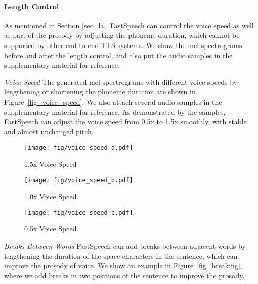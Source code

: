\documentclass{article}
\begin{document}
\paragraph{Length Control}
As mentioned in Section \ref{sec_la}, FastSpeech can control the voice speed as well as part of the prosody by adjusting the phoneme duration, which cannot be supported by other end-to-end TTS systems. We show the mel-spectrograms before and after the length control, and also put the audio samples in the supplementary material for reference.

\emph{Voice Speed}
The generated mel-spectrograms with different voice speeds by lengthening or shortening the phoneme duration are shown in Figure~\ref{fig_voice_speed}. We also attach several audio samples in the supplementary material for reference. As demonstrated by the samples, FastSpeech can adjust the voice speed from 0.5x to 1.5x smoothly, with stable and almost unchanged pitch. 

\begin{figure*}[h] 
	\centering
	\begin{subfigure}[h]{0.2\textwidth}
		\centering
		\texttt{[image: fig/voice\_speed\_a.pdf]}
		\caption{1.5x Voice Speed}
		\label{fig_rate150}
	\end{subfigure}
	\begin{subfigure}[h]{0.25\textwidth}
		\centering
		\texttt{[image: fig/voice\_speed\_b.pdf]}
		\caption{1.0x Voice Speed}
		\label{fig_rate100}
	\end{subfigure}
	\begin{subfigure}[h]{0.5\textwidth}
		\centering
		\texttt{[image: fig/voice\_speed\_c.pdf]}
		\caption{0.5x Voice Speed}
		\label{fig_rate050}
	\end{subfigure}
	\caption{The mel-spectrograms of the voice with 1.5x, 1.0x and 0.5x speed respectively. The input text is "\textit{For a while the preacher addresses himself to the congregation at large, who listen attentively}".}
	\label{fig_voice_speed}
\end{figure*}

\emph{Breaks Between Words}
FastSpeech can add breaks between adjacent words by lengthening the duration of the space characters in the sentence, which can improve the prosody of voice. We show an example in Figure~\ref{fig_breaking}, where we add breaks in two positions of the sentence to improve the prosody.
\end{document}
